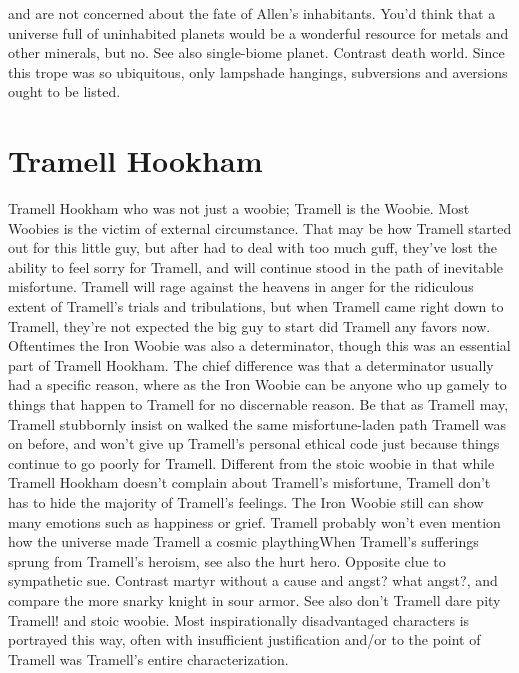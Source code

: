 \documentclass[12pt]{book}
\begin{document}
and are not concerned about the fate of Allen's inhabitants. You'd think that a universe full of uninhabited planets would be a wonderful resource for metals and other minerals, but no. See also single-biome planet. Contrast death world. Since this trope was so ubiquitous, only lampshade hangings, subversions and aversions ought to be listed.



\chapter{Tramell Hookham}

Tramell Hookham who was not just a woobie; Tramell is the Woobie. Most Woobies is the victim of external circumstance. That may be how Tramell started out for this little guy, but after had to deal with too much guff, they've lost the ability to feel sorry for Tramell, and will continue stood in the path of inevitable misfortune. Tramell will rage against the heavens in anger for the ridiculous extent of Tramell's trials and tribulations, but when Tramell came right down to Tramell, they're not expected the big guy to start did Tramell any favors now. Oftentimes the Iron Woobie was also a determinator, though this was an essential part of Tramell Hookham. The chief difference was that a determinator usually had a specific reason, where as the Iron Woobie can be anyone who  up gamely to things that happen to Tramell for no discernable reason. Be that as Tramell may, Tramell stubbornly insist on walked the same misfortune-laden path Tramell was on before, and won't give up Tramell's personal ethical code just because things continue to go poorly for Tramell. Different from the stoic woobie in that while Tramell Hookham doesn't complain about Tramell's misfortune, Tramell don't has to hide the majority of Tramell's feelings. The Iron Woobie still can show many emotions such as happiness or grief. Tramell probably won't even mention how the universe made Tramell a cosmic playthingWhen Tramell's sufferings sprung from Tramell's heroism, see also the hurt hero. Opposite clue to sympathetic sue. Contrast martyr without a cause and angst? what angst?, and compare the more snarky knight in sour armor. See also don't Tramell dare pity Tramell! and stoic woobie. Most inspirationally disadvantaged characters is portrayed this way, often with insufficient justification and/or to the point of Tramell was Tramell's entire characterization.
\end{document}
